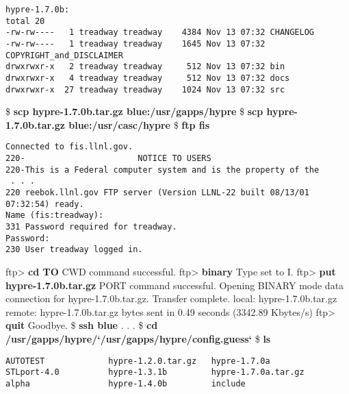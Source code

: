 \begin{ttfamily}
\begin{mdseries}
\begin{verbatim}
hypre-1.7.0b:
total 20
-rw-rw----   1 treadway treadway    4384 Nov 13 07:32 CHANGELOG
-rw-rw----   1 treadway treadway    1645 Nov 13 07:32 COPYRIGHT_and_DISCLAIMER
drwxrwxr-x   2 treadway treadway     512 Nov 13 07:32 bin
drwxrwxr-x   4 treadway treadway     512 Nov 13 07:32 docs
drwxrwxr-x  27 treadway treadway    1024 Nov 13 07:32 src
\end{verbatim}
\$ \textbf{scp hypre-1.7.0b.tar.gz blue:/usr/gapps/hypre}\linebreak
\$ \textbf{scp hypre-1.7.0b.tar.gz blue:/usr/casc/hypre}\linebreak
\$ \textbf{ftp fis}\linebreak
\begin{verbatim}
Connected to fis.llnl.gov.
220-                       NOTICE TO USERS
220-This is a Federal computer system and is the property of the
 . . .
220 reebok.llnl.gov FTP server (Version LLNL-22 built 08/13/01 07:32:54) ready.
Name (fis:treadway):
331 Password required for treadway.
Password:
230 User treadway logged in.
\end{verbatim}
ftp> \textbf{cd TO} CWD command successful.\linebreak
ftp> \textbf{binary} Type set to I.\linebreak
ftp> \textbf{put hypre-1.7.0b.tar.gz} PORT command successful. Opening BINARY mode data connection for hypre-1.7.0b.tar.gz. Transfer complete.\linebreak
local: hypre-1.7.0b.tar.gz remote: hypre-1.7.0b.tar.gz bytes sent in 0.49 seconds (3342.89 Kbytes/s)\linebreak
ftp> \textbf{quit} Goodbye.\linebreak
\$ \textbf{ssh blue}\linebreak
 . . .\linebreak
\$ \textbf{cd /usr/gapps/hypre/`/usr/gapps/hypre/config.guess`}\linebreak
\$ \textbf{ls}\linebreak
\begin{verbatim}
AUTOTEST             hypre-1.2.0.tar.gz   hypre-1.7.0a
STLport-4.0          hypre-1.3.1b         hypre-1.7.0a.tar.gz
alpha                hypre-1.4.0b         include

\end{verbatim}
\end{mdseries}
\end{ttfamily}
